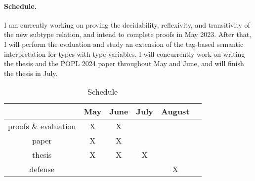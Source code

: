 \paragraph*{Schedule.}
I am currently working on proving the decidability, reflexivity,
and transitivity of the new subtype relation,
and intend to complete proofs in May 2023.
After that, I will perform the evaluation
and study an extension of the tag-based semantic interpretation
for types with type variables.
I will concurrently work on writing the thesis and the POPL 2024 paper
throughout May and June, and will finish the thesis in July.

\begin{table}[h]
  \caption{Schedule}
  \vspace*{0.25em}
  \centering\footnotesize
  \begin{tabular}{c|ccccc}
  \toprule
  & May & June & July & August \\
  \midrule
  proofs \& evaluation & X & X & & \\
  paper & X & X & & \\
  thesis & X & X & X & \\
  defense & & & & X \\
\end{tabular}
\end{table}








